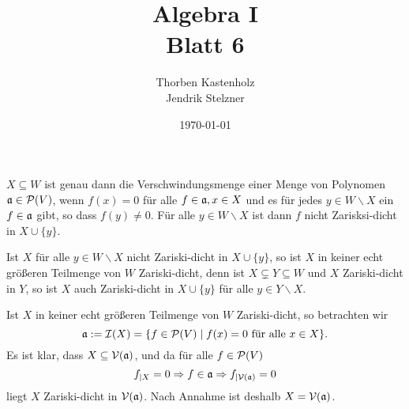 \documentclass[a4paper,10pt]{article}
\title{\sc Algebra I \\ \Large Blatt 6}
\author{Thorben Kastenholz \\ Jendrik Stelzner}
\date{\today}
\begin{document}
\maketitle





\section{}
$X \subseteq W$ ist genau dann die Verschwindungsmenge einer Menge von Polynomen $\mathfrak{a} \in \mathcal{P}(V)$, wenn $f(x) = 0$ für alle $f \in \mathfrak{a}, x \in X$ und es für jedes $y \in W \smallsetminus X$ ein $f \in \mathfrak{a}$ gibt, so dass $f(y) \neq 0$. Für alle $y \in W \smallsetminus X$ ist dann $f$ nicht Zarisksi-dicht in $X \cup \{y\}$.

Ist $X$ für alle $y \in W \smallsetminus X$ nicht Zariski-dicht in $X \cup \{y\}$, so ist $X$ in keiner echt größeren Teilmenge von $W$ Zariski-dicht, denn ist $X \subsetneq Y \subseteq W$ und $X$ Zariski-dicht in $Y$, so ist $X$ auch Zariski-dicht in $X \cup \{y\}$ für alle $y \in Y \smallsetminus X$.

Ist $X$ in keiner echt größeren Teilmenge von $W$ Zariski-dicht, so betrachten wir
\[
 \mathfrak{a} := \mathcal{I}(X) = \{f \in \mathcal{P}(V) \mid f(x) = 0 \text{ für alle } x \in X\}.
\]
Es ist klar, dass $X \subseteq \mathcal{V}(\mathfrak{a})$, und da für alle $f \in \mathcal{P}(V)$
\[
 f_{|X} = 0
 \Rightarrow f \in \mathfrak{a}
 \Rightarrow f_{|\mathcal{V}(\mathfrak{a})} = 0
\]
liegt $X$ Zariski-dicht in $\mathcal{V}(\mathfrak{a})$. Nach Annahme ist deshalb $X = \mathcal{V}(\mathfrak{a})$.
\end{document}
